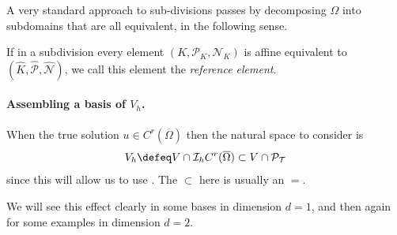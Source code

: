 

A very standard approach to sub-divisions passes by decomposing $\Omega$ into subdomains that are all equivalent, in the following sense.
\begin{definition}
    If in a subdivision every element $(K, \mathcal P_K, \mathcal N_K)$ is affine equivalent to
    $(\widehat{K}, \widehat{\mathcal P}, \widehat{\mathcal N})$,
    we call this element the \emph{reference element}.
\end{definition}

\paragraph{Assembling a basis of $V_h$.}

When the true solution $u \in C^r (\overline \Omega)$ then the natural space to consider is \begin{equation}
    V_h \defeq V \cap \mathcal I_h C^r(\overline \Omega) \subset V \cap \mathcal P_{\mathcal T}
\end{equation}
since this will allow us to use .
The $\subset$ here is usually an $=$.

We will see this effect clearly in some bases in dimension $d=1$, and then again for some examples in dimension $d = 2$.

